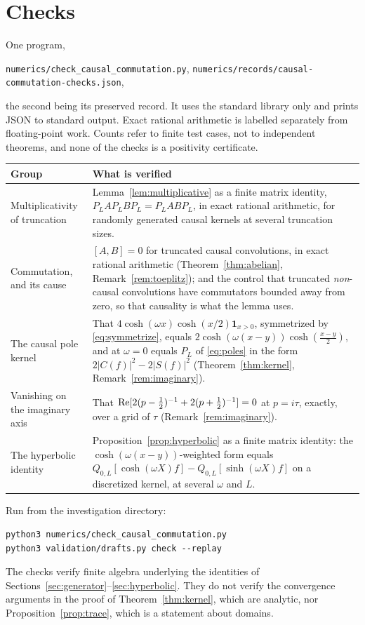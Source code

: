 \section{Checks}\label{app:checks}

One program,
\begin{center}
\texttt{numerics/check\_causal\_commutation.py},\qquad
\texttt{numerics/records/causal-commutation-checks.json},
\end{center}
the second being its preserved record. It uses the standard library only and prints JSON to standard output. Exact rational
arithmetic is labelled separately from floating-point work. Counts refer to
finite test cases, not to independent theorems, and none of the checks is a
positivity certificate.

\begin{center}
\begin{tabular}{@{}p{}p{}@{}}
\toprule
Group & What is verified\\
\midrule
Multiplicativity of truncation &
Lemma~\ref{lem:multiplicative} as a finite matrix identity,
$P_LAP_LBP_L=P_LABP_L$, in exact rational arithmetic, for randomly generated
causal kernels at several truncation sizes.\\
Commutation, and its cause &
$[A,B]=0$ for truncated causal convolutions, in exact rational arithmetic
(Theorem~\ref{thm:abelian}, Remark~\ref{rem:toeplitz}); and the control that
truncated \emph{non}-causal convolutions have commutators bounded away from
zero, so that causality is what the lemma uses.\\
The causal pole kernel &
That $4\cosh(\omega x)\cosh(x/2)\mathbf1_{x>0}$, symmetrized by
\eqref{eq:symmetrize}, equals
$2\cosh(\omega(x-y))\cosh(\frac{x-y}2)$, and at $\omega=0$ equals $P_L$ of
\eqref{eq:poles} in the form $2|C(f)|^2-2|S(f)|^2$
(Theorem~\ref{thm:kernel}, Remark~\ref{rem:imaginary}).\\
Vanishing on the imaginary axis &
That $\operatorname{Re}[2(p-\frac12)^{-1}+2(p+\frac12)^{-1}]=0$ at $p=i\tau$, exactly, over a
grid of $\tau$ (Remark~\ref{rem:imaginary}).\\
The hyperbolic identity &
Proposition~\ref{prop:hyperbolic} as a finite matrix identity: the
$\cosh(\omega(x-y))$-weighted form equals
$Q_{0,L}[\cosh(\omega X)f]-Q_{0,L}[\sinh(\omega X)f]$ on a discretized kernel,
at several $\omega$ and $L$.\\
\bottomrule
\end{tabular}
\end{center}

Run from the investigation directory:
\begin{verbatim}
python3 numerics/check_causal_commutation.py
python3 validation/drafts.py check --replay
\end{verbatim}

The checks verify finite algebra underlying the identities of
Sections~\ref{sec:generator}--\ref{sec:hyperbolic}. They do not verify the
convergence arguments in the proof of Theorem~\ref{thm:kernel}, which are
analytic, nor Proposition~\ref{prop:trace}, which is a statement about domains.
